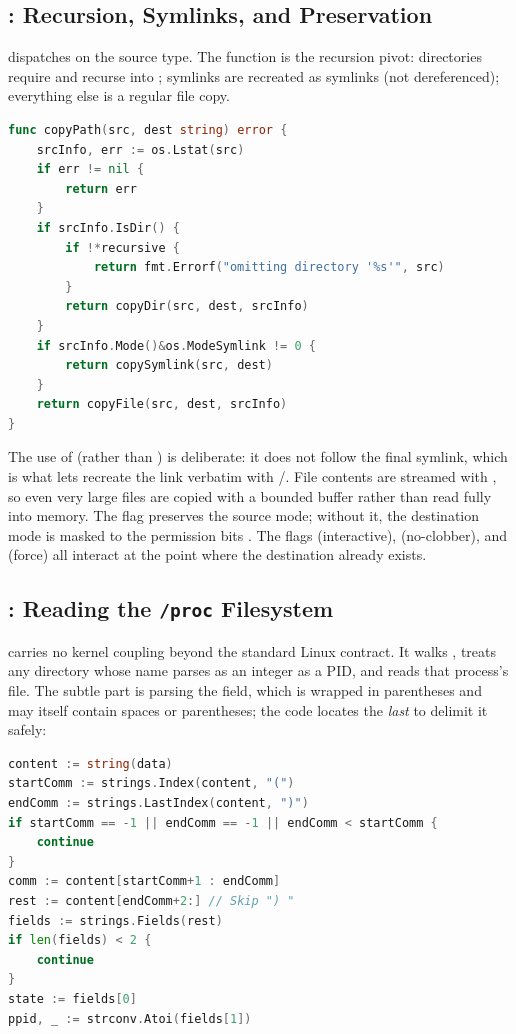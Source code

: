 \subsection{: Recursion, Symlinks, and Preservation}

 dispatches on the source type. The  function is the
recursion pivot: directories require  and recurse into ;
symlinks are recreated as symlinks (not dereferenced); everything else is a
regular file copy.

\begin{lstlisting}[language=Go, caption={Type-directed copy dispatch (utils/cmd/cp/main.go)}]
func copyPath(src, dest string) error {
    srcInfo, err := os.Lstat(src)
    if err != nil {
        return err
    }
    if srcInfo.IsDir() {
        if !*recursive {
            return fmt.Errorf("omitting directory '%s'", src)
        }
        return copyDir(src, dest, srcInfo)
    }
    if srcInfo.Mode()&os.ModeSymlink != 0 {
        return copySymlink(src, dest)
    }
    return copyFile(src, dest, srcInfo)
}
\end{lstlisting}

The use of  (rather than ) is deliberate: it does
not follow the final symlink, which is what lets  recreate the
link verbatim with /. File contents are
streamed with , so even very large files are copied with a bounded
buffer rather than read fully into memory. The  flag preserves the
source mode; without it, the destination mode is masked to the permission bits
. The flags  (interactive),  (no-clobber), and
 (force) all interact at the point where the destination already exists.

\subsection{: Reading the \texttt{/proc} Filesystem}

 carries no kernel coupling beyond the standard Linux 
contract. It walks , treats any directory whose name parses as an
integer as a PID, and reads that process's  file. The subtle part is
parsing the  field, which is wrapped in parentheses and may itself
contain spaces or parentheses; the code locates the \emph{last} \code{)} to
delimit it safely:

\begin{lstlisting}[language=Go, caption={Robustly parsing /proc/<pid>/stat (utils/cmd/ps/main.go)}]
content := string(data)
startComm := strings.Index(content, "(")
endComm := strings.LastIndex(content, ")")
if startComm == -1 || endComm == -1 || endComm < startComm {
    continue
}
comm := content[startComm+1 : endComm]
rest := content[endComm+2:] // Skip ") "
fields := strings.Fields(rest)
if len(fields) < 2 {
    continue
}
state := fields[0]
ppid, _ := strconv.Atoi(fields[1])
\end{lstlisting}

